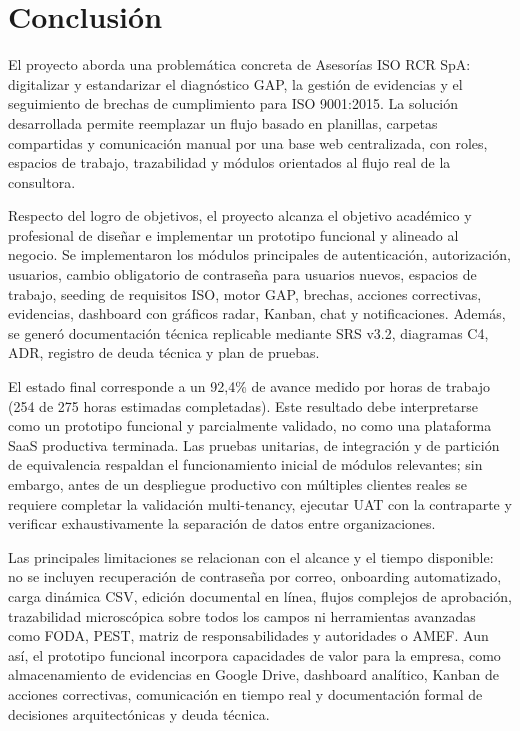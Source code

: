 \documentclass[final]{udpthesis}
\begin{document}
\chapter{Conclusión}

El proyecto aborda una problemática concreta de Asesorías ISO RCR SpA: digitalizar y estandarizar el diagnóstico GAP, la gestión de evidencias y el seguimiento de brechas de cumplimiento para ISO 9001:2015. La solución desarrollada permite reemplazar un flujo basado en planillas, carpetas compartidas y comunicación manual por una base web centralizada, con roles, espacios de trabajo, trazabilidad y módulos orientados al flujo real de la consultora.

Respecto del logro de objetivos, el proyecto alcanza el objetivo académico y profesional de diseñar e implementar un prototipo funcional y alineado al negocio. Se implementaron los módulos principales de autenticación, autorización, usuarios, cambio obligatorio de contraseña para usuarios nuevos, espacios de trabajo, seeding de requisitos ISO, motor GAP, brechas, acciones correctivas, evidencias, dashboard con gráficos radar, Kanban, chat y notificaciones. Además, se generó documentación técnica replicable mediante SRS v3.2, diagramas C4, ADR, registro de deuda técnica y plan de pruebas.

El estado final corresponde a un 92,4\% de avance medido por horas de trabajo (254 de 275 horas estimadas completadas). Este resultado debe interpretarse como un prototipo funcional y parcialmente validado, no como una plataforma SaaS productiva terminada. Las pruebas unitarias, de integración y de partición de equivalencia respaldan el funcionamiento inicial de módulos relevantes; sin embargo, antes de un despliegue productivo con múltiples clientes reales se requiere completar la validación multi-tenancy, ejecutar UAT con la contraparte y verificar exhaustivamente la separación de datos entre organizaciones.

Las principales limitaciones se relacionan con el alcance y el tiempo disponible: no se incluyen recuperación de contraseña por correo, onboarding automatizado, carga dinámica CSV, edición documental en línea, flujos complejos de aprobación, trazabilidad microscópica sobre todos los campos ni herramientas avanzadas como FODA, PEST, matriz de responsabilidades y autoridades o AMEF. Aun así, el prototipo funcional incorpora capacidades de valor para la empresa, como almacenamiento de evidencias en Google Drive, dashboard analítico, Kanban de acciones correctivas, comunicación en tiempo real y documentación formal de decisiones arquitectónicas y deuda técnica.
\end{document}
